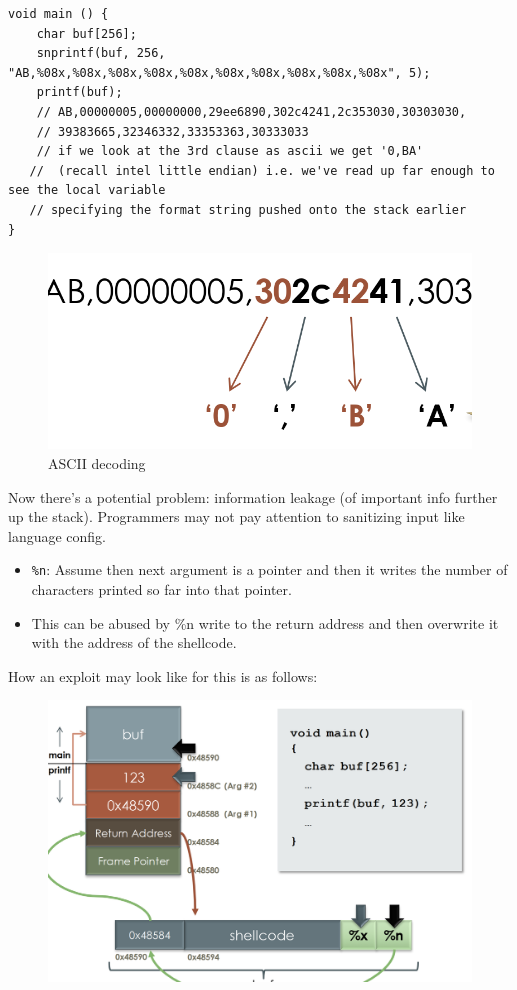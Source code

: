\documentclass[../notes.tex]{subfiles}
\begin{document}
\begin{listing}[H]
\begin{verbatim}
void main () {
    char buf[256];
    snprintf(buf, 256, "AB,%08x,%08x,%08x,%08x,%08x,%08x,%08x,%08x,%08x,%08x", 5);
    printf(buf);
    // AB,00000005,00000000,29ee6890,302c4241,2c353030,30303030,
    // 39383665,32346332,33353363,30333033
    // if we look at the 3rd clause as ascii we get '0,BA'
   //  (recall intel little endian) i.e. we've read up far enough to see the local variable
   // specifying the format string pushed onto the stack earlier
}
\end{verbatim}
\end{listing}
\begin{figure}[H]
    \centering
    \includegraphics[width=0.8\linewidth]{img/image_2023-01-16-19-06-48.png}
    \caption{ASCII decoding}
\end{figure}

Now there's a potential problem: information leakage (of important info further up the stack).
Programmers may not pay attention to sanitizing input like language config.


\begin{itemize}
    \item \texttt{\%n}: Assume then next argument is a pointer and then it writes the number of characters printed so far into that pointer. 
    \item This can be abused by \%n  write to the return address and then overwrite it with the address of the shellcode.
\end{itemize}


How an exploit may look like for this is as follows:

\begin{figure}[H]
    \centering
    \includegraphics[width=0.8\linewidth]{img/image_2023-01-16-19-39-16.png}
\end{figure}
\end{document}
